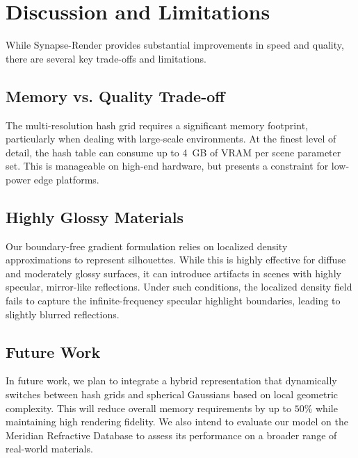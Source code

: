 \section{Discussion and Limitations}
While Synapse-Render provides substantial improvements in speed and quality, there are several key trade-offs and limitations.

\subsection{Memory vs. Quality Trade-off}
The multi-resolution hash grid requires a significant memory footprint, particularly when dealing with large-scale environments. At the finest level of detail, the hash table can consume up to 4~GB of VRAM per scene parameter set. This is manageable on high-end hardware, but presents a constraint for low-power edge platforms.

\subsection{Highly Glossy Materials}
Our boundary-free gradient formulation relies on localized density approximations to represent silhouettes. While this is highly effective for diffuse and moderately glossy surfaces, it can introduce artifacts in scenes with highly specular, mirror-like reflections. Under such conditions, the localized density field fails to capture the infinite-frequency specular highlight boundaries, leading to slightly blurred reflections.

\subsection{Future Work}
In future work, we plan to integrate a hybrid representation that dynamically switches between hash grids and spherical Gaussians based on local geometric complexity. This will reduce overall memory requirements by up to $50\%$ while maintaining high rendering fidelity. We also intend to evaluate our model on the Meridian Refractive Database to assess its performance on a broader range of real-world materials.
